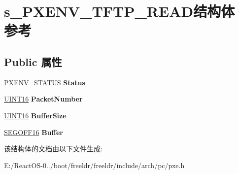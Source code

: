 \hypertarget{structs___p_x_e_n_v___t_f_t_p___r_e_a_d}{}\section{s\+\_\+\+P\+X\+E\+N\+V\+\_\+\+T\+F\+T\+P\+\_\+\+R\+E\+A\+D结构体 参考}
\label{structs___p_x_e_n_v___t_f_t_p___r_e_a_d}
\subsection*{Public 属性}
\begin{DoxyCompactItemize}
\item 
\mbox{\label{structs___p_x_e_n_v___t_f_t_p___r_e_a_d_a0954d26c78d4a25885942d1c974834e5}} 
P\+X\+E\+N\+V\+\_\+\+S\+T\+A\+T\+US {\bfseries Status}
\item 
\mbox{\label{structs___p_x_e_n_v___t_f_t_p___r_e_a_d_a41311e85c617be224b1a40c1f948f67c}} 
\hyperlink{_processor_bind_8h_a09f1a1fb2293e33483cc8d44aefb1eb1}{U\+I\+N\+T16} {\bfseries Packet\+Number}
\item 
\mbox{\label{structs___p_x_e_n_v___t_f_t_p___r_e_a_d_aade673509ad1a889ae67c789f24177e8}} 
\hyperlink{_processor_bind_8h_a09f1a1fb2293e33483cc8d44aefb1eb1}{U\+I\+N\+T16} {\bfseries Buffer\+Size}
\item 
\mbox{\label{structs___p_x_e_n_v___t_f_t_p___r_e_a_d_a72652bee03031e30aed80148b535cd5a}} 
\hyperlink{structs___s_e_g_o_f_f16}{S\+E\+G\+O\+F\+F16} {\bfseries Buffer}
\end{DoxyCompactItemize}


该结构体的文档由以下文件生成\+:\begin{DoxyCompactItemize}
\item 
E\+:/\+React\+O\+S-\/0../boot/freeldr/freeldr/include/arch/pc/pxe.\+h\end{DoxyCompactItemize}
